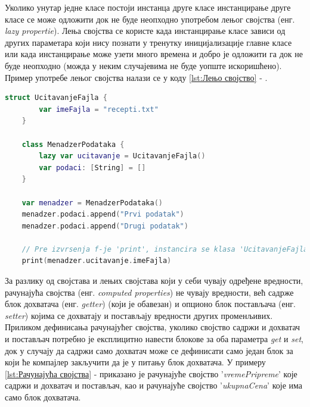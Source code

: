\documentclass[12pt,oneside]{memoir}
\begin{document}
\indent Уколико унутар једне класе постоји инстанца друге класе инстанцирање друге класе се може одложити док не буде неопходно употребом лењог својства (енг. \textit{lazy propertie}). Лења својства се користе када инстанцирање класе зависи од других параметара који нису познати у тренутку иницијализације главне класе или када инстанцирање може узети много времена и добро је одложити га док не буде неопходно (можда у неким случајевима не буде уопште искоришћено). Пример употребе лењог својства налази се у коду \ref{lst:Лењо својство} - .

\begin{lstlisting}[caption=\textit{{Лењо својство}}, label={lst:Лењо својство}, language=Swift, frame=single]
    struct UcitavanjeFajla {
        var imeFajla = "recepti.txt"
    }
    
    class MenadzerPodataka {
        lazy var ucitavanje = UcitavanjeFajla()
        var podaci: [String] = []
    }
    
    var menadzer = MenadzerPodataka()
    menadzer.podaci.append("Prvi podatak")
    menadzer.podaci.append("Drugi podatak")
    
    // Pre izvrsenja f-je 'print', instancira se klasa 'UcitavanjeFajla'
    print(menadzer.ucitavanje.imeFajla)
\end{lstlisting}

\indent За разлику од својстава и лењих својстава који у себи чувају одређене вредности, рачунајућа својства (енг. \textit{computed properties}) не чувају вредности, већ садрже блок дохватача (енг. \textit{getter}) (који је обавезан) и опционо блок постављача (енг. \textit{setter}) којима се дохватају и постављају вредности других променљивих. Приликом дефинисања рачунајућег својства, уколико својство садржи и дохватач и постављач потребно је експлицитно навести блокове за оба параметра \textit{get} и \textit{set}, док у случају да садржи само дохватач може се дефинисати само један блок за који ће компајлер закључити да је у питању блок дохватача. У примеру \ref{lst:Рачунајућа својства} -  приказано је рачунајуће својство '\textit{vremePripreme}' које садржи и дохватач и постављач, као и рачунајуће својство '\textit{ukupnaCena}' које има само блок дохватача.
\end{document}
